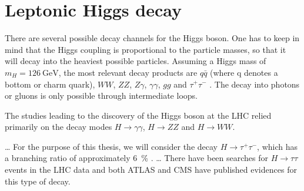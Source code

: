 \section{Leptonic Higgs decay}
There are several possible decay channels for the Higgs boson.
One has to keep in mind that the Higgs coupling is proportional to the particle masses, so that it will decay into the heaviest possible particles.
Assuming a Higgs mass of $m_H = \SI{126}{\giga\electronvolt}$, the most relevant decay products are $q \bar q$ (where q denotes a bottom or charm quark), $WW$, $ZZ$, $Z \gamma$, $\gamma \gamma$, $gg$ and $\tau^+ \tau^-$ \cite{higgshandbook2}.
The decay into photons or gluons is only possible through intermediate loops.

The studies leading to the discovery of the Higgs boson at the LHC relied primarily on the decay modes $H \rightarrow \gamma \gamma$, $H \rightarrow ZZ$ and $H \rightarrow WW$.

\ldots
For the purpose of this thesis, we will consider the decay $H \rightarrow \tau^+ \tau^-$, which has a branching ratio of approximately \SI{6}{\percent} \cite{higgshandbook3}.
\ldots
There have been searches for $H \rightarrow \tau \tau$ events in the LHC data and both ATLAS \cite{htau_atlas} and CMS \cite{htau_cms} have published evidences for this type of decay.

